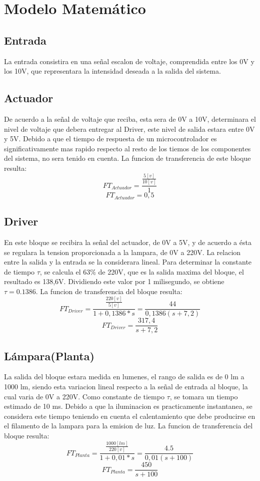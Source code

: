 \documentclass[a4paper,11pt]{article}
\begin{document}
\section{Modelo Matemático}
\subsection{Entrada}
La entrada consistira en una señal escalon de voltaje, comprendida entre los 0V y los 10V, que representara la intensidad deseada a la salida del sistema.
\subsection{Actuador}
De acuerdo a la señal de voltaje que reciba, esta sera de 0V a 10V, determinara el nivel de voltaje que debera entregar al Driver, este nivel de salida estara entre 0V y 5V.
Debido a que el tiempo de respuesta de un microcontrolador es significativamente mas rapido respecto al resto de los tiemos de los componentes del sistema, no sera tenido en cuenta. La funcion de transferencia de este bloque resulta:
$$FT_{Actuador}=\frac{\frac{5[v]}{10[v]}}{1}$$
$$FT_{Actuador}=0,5$$
\subsection{Driver}
En este bloque se recibira la señal del actuador, de 0V a 5V, y de acuerdo a ésta se regulara la tension proporcionada a la lampara, de 0V a 220V. La relacion entre la salida y la entrada se la considerara lineal. Para determinar la constante de tiempo $\tau$, se  calcula el 63\% de 220V, que es la salida maxima del bloque, el resultado es 138,6V. Dividiendo este valor por 1 milisegundo, se obtiene $\tau= 0.1386$.
La funcion de transferencia del bloque resulta:
$$FT_{Driver}=\frac{\frac{220[v]}{5[v]}}{1+0,1386*s}=\frac{44}{0,1386(s+7,2)}$$
$$FT_{Driver}=\frac{317,4}{s+7,2}$$
\subsection{Lámpara(Planta)}
La salida del bloque estara medida en lumenes, el rango de salida es de 0 lm a 1000 lm, siendo esta variacion lineal respecto a la señal de entrada al bloque, la cual varia de 0V a 220V. Como constante de tiempo  $\tau$, se tomara un tiempo estimado de 10 ms. Debido a que la iluminacion es practicamente instantanea, se considera este tiempo teniendo en cuenta el calentamiento que debe producirse en el filamento de la lampara para la emision de luz. 
La funcion de transferencia del bloque resulta:
$$FT_{Planta}=\frac{\frac{1000[lm]}{220[v]}}{1+0,01*s}=\frac{4.5}{0,01(s+100)}$$
$$FT_{Planta}=\frac{450}{s+100}$$
\end{document}
